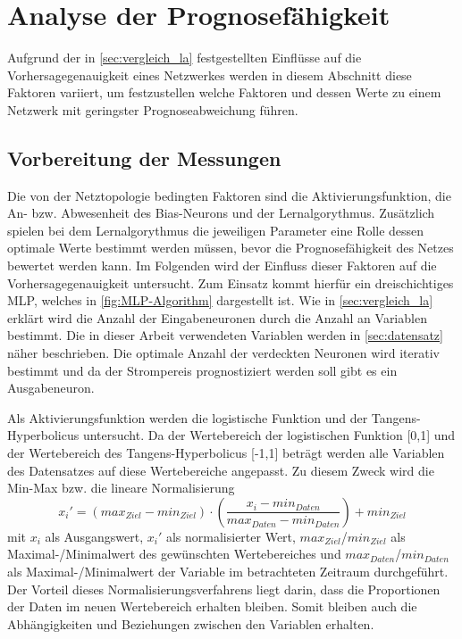 

\section{Analyse der Prognosefähigkeit}\label{sec:analyse}

Aufgrund der in \autoref{sec:vergleich_la} festgestellten Einflüsse auf die Vorhersagegenauigkeit eines Netzwerkes werden in diesem Abschnitt diese Faktoren variiert, um festzustellen welche Faktoren und dessen Werte zu einem Netzwerk mit geringster Prognoseabweichung führen.



\subsection{Vorbereitung der Messungen}

Die von der Netztopologie bedingten Faktoren sind die Aktivierungsfunktion, die An- bzw. Abwesenheit des Bias-Neurons und der Lernalgorythmus. Zusätzlich spielen bei dem Lernalgorythmus die jeweiligen Parameter eine Rolle dessen optimale Werte bestimmt werden müssen, bevor die Prognosefähigkeit des Netzes bewertet werden kann.
Im Folgenden wird der Einfluss dieser Faktoren auf die Vorhersagegenauigkeit untersucht. Zum Einsatz kommt hierfür ein dreischichtiges MLP, welches in \autoref{fig:MLP-Algorithm} dargestellt ist. Wie in \autoref{sec:vergleich_la} erklärt wird die Anzahl der Eingabeneuronen durch die Anzahl an Variablen bestimmt. Die in dieser Arbeit verwendeten Variablen werden in \autoref{sec:datensatz} näher beschrieben. Die optimale Anzahl der verdeckten Neuronen wird iterativ bestimmt und da der Strompereis prognostiziert werden soll gibt es ein Ausgabeneuron. 

Als Aktivierungsfunktion werden die logistische Funktion und der Tangens-Hyperbolicus untersucht. Da der Wertebereich der logistischen Funktion [0,1] und der Wertebereich des Tangens-Hyperbolicus [-1,1] beträgt werden alle Variablen des Datensatzes auf diese Wertebereiche angepasst. Zu diesem Zweck wird die Min-Max bzw. die lineare Normalisierung
\begin{equation}
x_i'=(max_{Ziel} - min_{Ziel}) \cdot \left ( \frac{x_i-min_{Daten}}{max_{Daten}-min_{Daten}} \right ) + min_{Ziel}
\label{gl:norm}
\end{equation}
mit $x_i$ als Ausgangswert, $x_i'$ als normalisierter Wert, $max_{Ziel}$/$min_{Ziel}$ als Maximal-/Minimalwert des gewünschten Wertebereiches und $max_{Daten}$/$min_{Daten}$ als Maximal-/Minimalwert der Variable im betrachteten Zeitraum durchgeführt. Der Vorteil dieses Normalisierungsverfahrens liegt darin, dass die Proportionen der Daten im neuen Wertebereich erhalten bleiben. Somit bleiben auch die Abhängigkeiten und Beziehungen zwischen den Variablen erhalten.\, 


